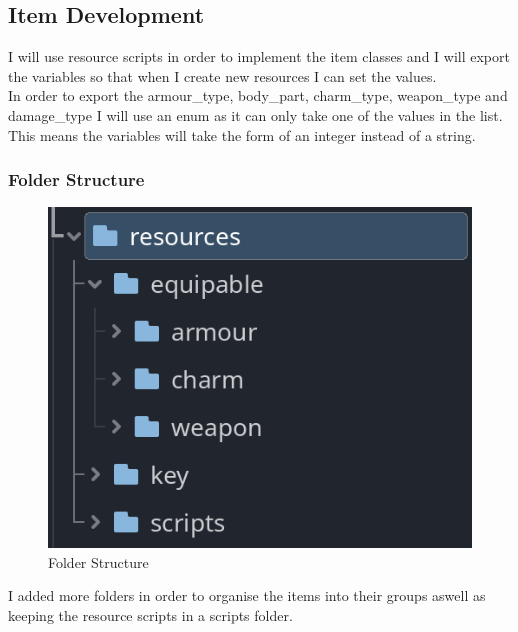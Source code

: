 \documentclass{article}
\begin{document}
        \subsection{Item Development}
        I will use resource scripts in order to implement the item classes and I will export the variables so that when I create new resources I can set the values.\\
        In order to export the armour\_type, body\_part, charm\_type, weapon\_type and damage\_type I will use an enum as it can only take one of the values in the list. This means the variables will take the form of an integer instead of a string.\\
        \subsubsection{Folder Structure}
        \begin{figure}[H]
                \centering
                \includegraphics{images/development/Item_folder.PNG}
                \caption{Folder Structure}
        \end{figure}
        \[\]
        I added more folders in order to organise the items into their groups aswell as keeping the resource scripts in a scripts folder.\\
\end{document}
